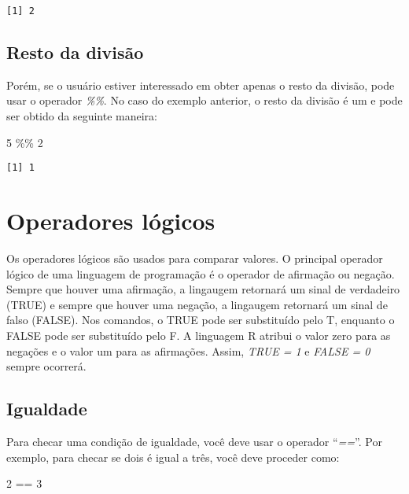 \documentclass[
  letterpaper,
  DIV=11,
  numbers=noendperiod]{scrreprt}
\newenvironment{Shaded}{\begin{snugshade}}{\end{snugshade}}
\newcommand{\DecValTok}[1]{\textcolor[rgb]{0.68,0.00,0.00}{#1}}
\newcommand{\SpecialCharTok}[1]{\textcolor[rgb]{0.37,0.37,0.37}{#1}}
\begin{document}
\begin{verbatim}
[1] 2
\end{verbatim}

\subsection{Resto da divisão}\label{resto-da-divisuxe3o}

Porém, se o usuário estiver interessado em obter apenas o resto da
divisão, pode usar o operador \emph{\%\%}. No caso do exemplo anterior,
o resto da divisão é um e pode ser obtido da seguinte maneira:

\begin{Shaded}
\begin{Highlighting}[]
\DecValTok{5} \SpecialCharTok{\%\%} \DecValTok{2}
\end{Highlighting}
\end{Shaded}

\begin{verbatim}
[1] 1
\end{verbatim}

\section{Operadores lógicos}\label{operadores-luxf3gicos}

Os operadores lógicos são usados para comparar valores. O principal
operador lógico de uma linguagem de programação é o operador de
afirmação ou negação. Sempre que houver uma afirmação, a lingaugem
retornará um sinal de verdadeiro (TRUE) e sempre que houver uma negação,
a lingaugem retornará um sinal de falso (FALSE). Nos comandos, o TRUE
pode ser substituído pelo T, enquanto o FALSE pode ser substituído pelo
F. A linguagem R atribui o valor zero para as negações e o valor um para
as afirmações. Assim, \emph{TRUE = 1} e \emph{FALSE = 0} sempre
ocorrerá.

\subsection{Igualdade}\label{igualdade}

Para checar uma condição de igualdade, você deve usar o operador
``\emph{==}''. Por exemplo, para checar se dois é igual a três, você
deve proceder como:

\begin{Shaded}
\begin{Highlighting}[]
\DecValTok{2} \SpecialCharTok{==} \DecValTok{3}
\end{Highlighting}
\end{Shaded}
\end{document}
